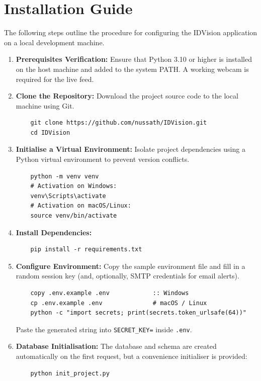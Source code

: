 \documentclass[11pt]{report}
\begin{document}
\section{Installation Guide}
The following steps outline the procedure for configuring the IDVision application on a local development machine. 

\begin{enumerate}
    \item \textbf{Prerequisites Verification:} Ensure that Python 3.10 or higher is installed on the host machine and added to the system PATH. A working webcam is required for the live feed.

    \item \textbf{Clone the Repository:} Download the project source code to the local machine using Git.
    \begin{verbatim}
    git clone https://github.com/nussath/IDVision.git
    cd IDVision
    \end{verbatim}

    \item \textbf{Initialise a Virtual Environment:} Isolate project dependencies using a Python virtual environment to prevent version conflicts.
    \begin{verbatim}
    python -m venv venv
    # Activation on Windows:
    venv\Scripts\activate
    # Activation on macOS/Linux:
    source venv/bin/activate
    \end{verbatim}

    \item \textbf{Install Dependencies:}
    \begin{verbatim}
    pip install -r requirements.txt
    \end{verbatim}

    \item \textbf{Configure Environment:} Copy the sample environment file and fill in a random session key (and, optionally, SMTP credentials for email alerts).
    \begin{verbatim}
    copy .env.example .env            :: Windows
    cp .env.example .env              # macOS / Linux
    python -c "import secrets; print(secrets.token_urlsafe(64))"
    \end{verbatim}
    Paste the generated string into \texttt{SECRET\_KEY=} inside \texttt{.env}.

    \item \textbf{Database Initialisation:} The database and schema are created automatically on the first request, but a convenience initialiser is provided:
    \begin{verbatim}
    python init_project.py
    \end{verbatim}


\end{enumerate}
\end{document}
